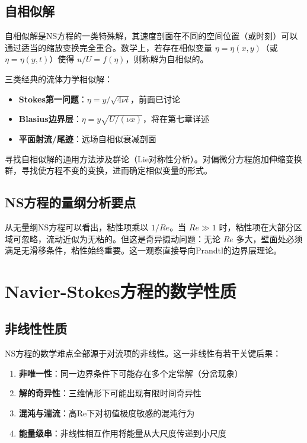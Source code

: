 \subsection{自相似解}

自相似解是NS方程的一类特殊解，其速度剖面在不同的空间位置（或时刻）可以通过适当的缩放变换完全重合。数学上，若存在相似变量 $\eta = \eta(x,y)$（或 $\eta = \eta(y,t)$）使得 $u/U = f(\eta)$，则称解为自相似的。

三类经典的流体力学相似解：
\begin{itemize}
    \item \textbf{Stokes第一问题}：$\eta = y/\sqrt{4\nu t}$，前面已讨论
    \item \textbf{Blasius边界层}：$\eta = y\sqrt{U/(\nu x)}$，将在第七章详述
    \item \textbf{平面射流/尾迹}：远场自相似衰减剖面
\end{itemize}

寻找自相似解的通用方法涉及群论（Lie对称性分析）。对偏微分方程施加伸缩变换群，寻找使方程不变的变换，进而确定相似变量的形式。

\subsection{NS方程的量纲分析要点}

从无量纲NS方程可以看出，粘性项乘以 $1/Re$。当 $Re \gg 1$ 时，粘性项在大部分区域可忽略，流动近似为无粘的。但这是奇异摄动问题：无论 $Re$ 多大，壁面处必须满足无滑移条件，粘性始终重要。这一观察直接导向Prandtl的边界层理论。

\section{Navier-Stokes方程的数学性质}

\subsection{非线性性质}

NS方程的数学难点全部源于对流项的非线性。这一非线性有若干关键后果：

\begin{enumerate}
    \item \textbf{非唯一性}：同一边界条件下可能存在多个定常解（分岔现象）
    \item \textbf{解的奇异性}：三维情形下可能出现有限时间奇异性
    \item \textbf{混沌与湍流}：高Re下对初值极度敏感的混沌行为
    \item \textbf{能量级串}：非线性相互作用将能量从大尺度传递到小尺度
\end{enumerate}

